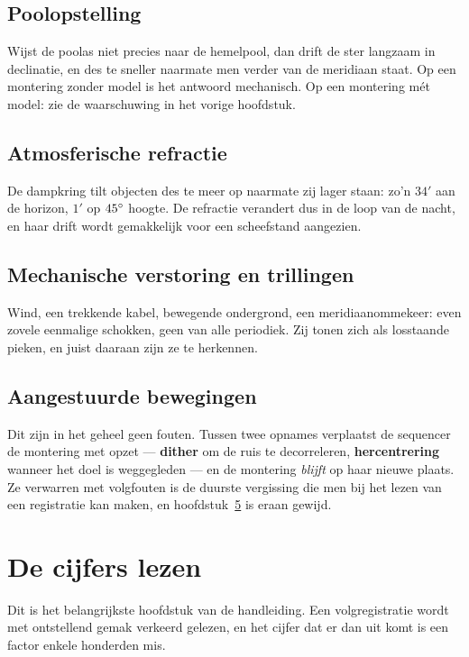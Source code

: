 \section{Poolopstelling}

Wijst de poolas niet precies naar de hemelpool, dan drift de ster langzaam in
declinatie, en des te sneller naarmate men verder van de meridiaan staat. Op
een montering zonder model is het antwoord mechanisch. Op een montering mét
model: zie de waarschuwing in het vorige hoofdstuk.

\section{Atmosferische refractie}

De dampkring tilt objecten des te meer op naarmate zij lager staan: zo'n $34'$
aan de horizon, $1'$ op $45^\circ$ hoogte. De refractie verandert dus in de
loop van de nacht, en haar drift wordt gemakkelijk voor een scheefstand
aangezien.

\section{Mechanische verstoring en trillingen}

Wind, een trekkende kabel, bewegende ondergrond, een meridiaanommekeer: even
zovele eenmalige schokken, geen van alle periodiek. Zij tonen zich als
losstaande pieken, en juist daaraan zijn ze te herkennen.

\section{Aangestuurde bewegingen}

Dit zijn in het geheel geen fouten. Tussen twee opnames verplaatst de sequencer
de montering met opzet --- \textbf{dither} om de ruis te decorreleren,
\textbf{hercentrering} wanneer het doel is weggegleden --- en de montering
\emph{blijft} op haar nieuwe plaats. Ze verwarren met volgfouten is de duurste
vergissing die men bij het lezen van een registratie kan maken, en
hoofdstuk~\ref{ch:stats} is eraan gewijd.

\chapter{De cijfers lezen}
\label{ch:stats}

\begin{warning}
Dit is het belangrijkste hoofdstuk van de handleiding. Een volgregistratie
wordt met ontstellend gemak verkeerd gelezen, en het cijfer dat er dan uit komt
is een factor enkele honderden mis.
\end{warning}

